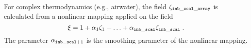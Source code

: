 For complex thermodynamics (e.g., airwater), the field $\zeta_\mathrm{\tt inb\_scal\_array}$ is calculated from a nonlinear mapping applied on the field
\begin{equation}
\xi =1+\alpha_1\zeta_1+\ldots+\alpha_\mathrm{\tt inb\_scal}\zeta_\mathrm{\tt inb\_scal}\;.
\end{equation}
The parameter $\alpha_\mathrm{\tt inb\_scal+1}$ is the smoothing parameter of the nonlinear mapping.
